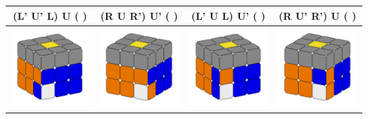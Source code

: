 \documentclass[12pt, a3paper]{article}
\newcommand{\scale}{1}
\begin{document}
\begin{center}
\begin{longtable}{c|c||c|c}
	(L' U' L) U ( ) & (R U R') U' ( ) & (L' U L) U' ( ) & (R U' R') U ( ) \\
	\hline
	\includegraphics[scale=\scale]{17_left} & \includegraphics[scale=\scale]{17_right}  &  \includegraphics[scale=\scale]{18_left} & \includegraphics[scale=\scale]{18_right} \\

\end{longtable}
\end{center}
\end{document}
